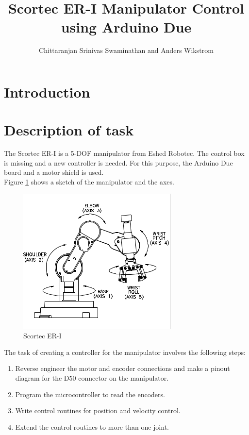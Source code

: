 \documentclass[10pt,a4paper]{article}
\author{Chittaranjan Srinivas Swaminathan and Anders Wikstrom}
\title{Scortec ER-I Manipulator Control using Arduino Due}
\begin{document}
\maketitle
\tableofcontents
\newpage
\section{Introduction}

\section{Description of task}
The Scortec ER-I is a 5-DOF manipulator from Eshed Robotec. The
control box is missing and a new controller is needed. For this
purpose, the Arduino Due board and a motor shield is used. \\

Figure \ref{fig:axes} shows a sketch of the manipulator and the axes.

\begin{figure}[h]
    \centering
    \includegraphics{axes.png}
    \caption{Scortec ER-I}
    \label{fig:axes}
\end{figure}

The task of creating a controller for the manipulator involves the
following steps:
\begin{enumerate}
\item Reverse engineer the motor and encoder connections and make a
  pinout diagram for the D50 connector on the manipulator.
\item Program the microcontroller to read the encoders.
\item Write control routines for position and velocity control.
\item Extend the control routines to more than one joint.
\end{enumerate}
\end{document}

